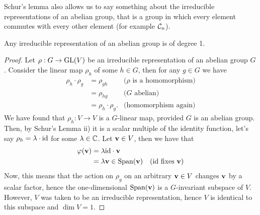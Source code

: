 
Schur's lemma also allows us to say something about the irreducible representations of an abelian group, that is a group in which every element commutes with every other element (for example $\mathcal{C}_n$).

\begin{corollary}\label{cor:abelianirred}
	Any irreducible representation of an abelian group is of degree 1.
\end{corollary}
\begin{proof}\cite[\textit{Mentioned in passing in} Sect.1.3.]{FultonHarris}
	Let $\rho: G \rightarrow \text{GL}(V)$ be an irreducible representation of an abelian group $G$. Consider the linear map $\rho_h$ of some $h \in G$, then for any $g \in G$ we have
	\begin{align*}
		\rho_h \cdot \rho_g &= \rho_{gh} & \text{($\rho$ is a homomorphism)} \\
		&= \rho_{hg} & \text{($G$ abelian)} \\
		&= \rho_h \cdot \rho_g. & \text{(homomorphism again)}
	\end{align*}
	We have found that $\rho_h: V \rightarrow V$ is a $G$-linear map, provided $G$ is an abelian group. Then, by Schur's Lemma ii) it is a scalar multiple of the identity function, let's say $\rho_h = \lambda \cdot \text{id}$ for some $\lambda \in \mathbb{C}$. Let $\mathbf{v} \in V$, then we have that
	\begin{align*}
		\varphi(\mathbf{v}) &= \lambda \text{id} \cdot \mathbf{v} \\
		&= \lambda \mathbf{v} \in \text{Span}(\mathbf{v}) & \text{($\text{id}$ fixes $\mathbf{v}$)}
	\end{align*}
	Now, this means that the action on $\rho_g$ on an arbitrary $\mathbf{v} \in V$ changes $\mathbf{v}$ by a scalar factor, hence the one-dimensional $\text{Span}(\mathbf{v})$ is a $G$-invariant subspace of $V$. However, $V$ was taken to be an irreducible representation, hence $V$ is identical to this subspace and $\dim V = 1$.
\end{proof}


